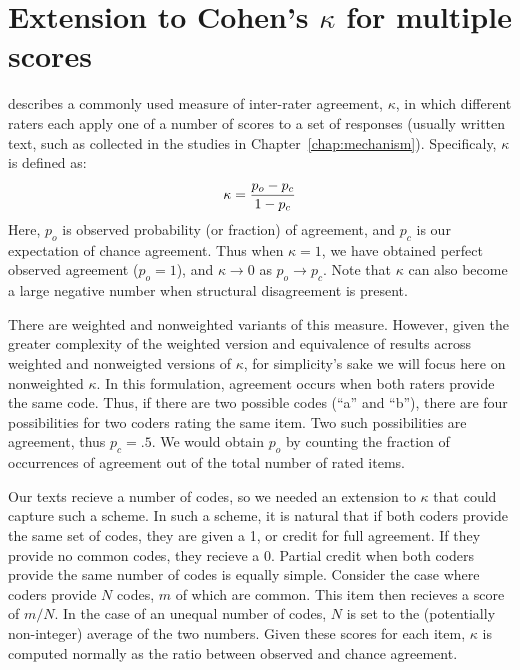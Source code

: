 \graphicspath{{appendices/kappa-extension/}}

\chapter{Extension to Cohen's \texorpdfstring{$\kappa$}{kappa} for multiple scores}
\label{app:kappa}

\textcite{cohen_coefficient_1960} describes a commonly used measure of
inter-rater agreement, $\kappa$, in which different raters each
apply one of a number of scores to a set of responses (usually written text,
such as collected in the studies in Chapter~\ref{chap:mechanism}). Specificaly,
$\kappa$ is defined as: \[ \kappa = {p_o - p_c \over 1 - p_c} \] Here, $p_o$ is
observed probability (or fraction) of agreement, and $p_c$ is our expectation of
chance agreement. Thus when
$\kappa=1$, we have obtained perfect observed agreement ($p_o = 1$), and
$\kappa \to 0$ as $p_o \to p_c$. Note that $\kappa$ can also become a large
negative number when structural disagreement is present. 

There are weighted and nonweighted variants of this measure. However, given the
greater complexity of the weighted version and equivalence of results across
weighted and nonweigted versions of $\kappa$, for simplicity's sake we will
focus here on nonweighted $\kappa$. In this formulation, agreement occurs when
both raters provide the same code. Thus, if there are two possible codes (“a”
and “b”), there are four possibilities for two coders rating the same item.  Two
such possibilities are agreement, thus $p_c = .5$. We would obtain $p_o$ by
counting the fraction of occurrences of agreement out of the total number of
rated items.

Our texts recieve a number of codes, so we needed an extension to $\kappa$ that
could capture such a scheme. In such a scheme, it is natural that if both coders
provide the same set of codes, they are given a 1, or credit for full agreement.
If they provide no common codes, they recieve a 0. Partial credit when both
coders provide the same number of codes is equally simple. Consider the case
where coders provide $\mathit{N}$ codes, $m$ of which are common. This item then
recieves a score of $m/\mathit{N}$. In the case of an unequal number of codes,
$\mathit{N}$ is set to the (potentially non-integer) average of the two numbers.
Given these scores for each item, $\kappa$ is computed normally as the ratio
between observed and chance agreement. 

